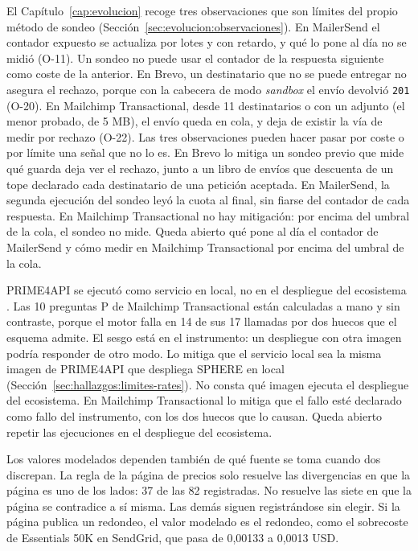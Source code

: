 El Capítulo~\ref{cap:evolucion} recoge tres observaciones que son límites del propio método de sondeo (Sección~\ref{sec:evolucion:observaciones}).
En MailerSend el contador expuesto se actualiza por lotes y con retardo, y qué lo pone al día no se midió (O-11).
Un sondeo no puede usar el contador de la respuesta siguiente como coste de la anterior.
En Brevo, un destinatario que no se puede entregar no asegura el rechazo, porque con la cabecera de modo \textit{sandbox} el envío devolvió \texttt{201} (O-20).
En Mailchimp Transactional, desde 11 destinatarios o con un adjunto (el menor probado, de 5 MB), el envío queda en cola, y deja de existir la vía de medir por rechazo (O-22).
Las tres observaciones pueden hacer pasar por coste o por límite una señal que no lo es.
En Brevo lo mitiga un sondeo previo que mide qué guarda deja ver el rechazo, junto a un libro de envíos que descuenta de un tope declarado cada destinatario de una petición aceptada.
En MailerSend, la segunda ejecución del sondeo leyó la cuota al final, sin fiarse del contador de cada respuesta.
En Mailchimp Transactional no hay mitigación: por encima del umbral de la cola, el sondeo no mide.
Queda abierto qué pone al día el contador de MailerSend y cómo medir en Mailchimp Transactional por encima del umbral de la cola.

PRIME4API se ejecutó como servicio en local, no en el despliegue del ecosistema \citep{gavira2026tfm}.
Las 10 preguntas P de Mailchimp Transactional están calculadas a mano y sin contraste, porque el motor falla en 14 de sus 17 llamadas por dos huecos que el esquema admite.
El sesgo está en el instrumento: un despliegue con otra imagen podría responder de otro modo.
Lo mitiga que el servicio local sea la misma imagen de PRIME4API que despliega SPHERE en local (Sección~\ref{sec:hallazgos:limites-rates}).
No consta qué imagen ejecuta el despliegue del ecosistema.
En Mailchimp Transactional lo mitiga que el fallo esté declarado como fallo del instrumento, con los dos huecos que lo causan.
Queda abierto repetir las ejecuciones en el despliegue del ecosistema.

Los valores modelados dependen también de qué fuente se toma cuando dos discrepan.
La regla de la página de precios solo resuelve las divergencias en que la página es uno de los lados: 37 de las 82 registradas.
No resuelve las siete en que la página se contradice a sí misma.
Las demás siguen registrándose sin elegir.
Si la página publica un redondeo, el valor modelado es el redondeo, como el sobrecoste de Essentials 50K en SendGrid, que pasa de 0,00133 a 0,0013 USD.


